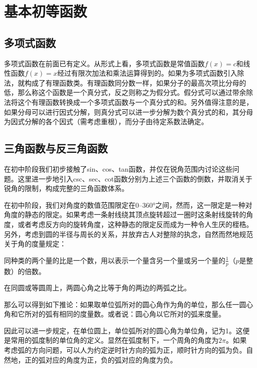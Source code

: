 \newpage
\section{基本初等函数}

\subsection{多项式函数}
多项式函数在前面已有定义。从形式上看，多项式函数是常值函数\(f(x) = c\)和线性函数\(f(x) = x\)经过有限次加法和乘法运算得到的。如果为多项式函数引入除法，就构成了{\heiti{}有理函数类}。有理函数同分数一样，如果分子的最高次项比分母的低，那么称这个函数是一个真分式，反之则称之为假分式。假分式可以通过带余除法将这个有理函数转换成一个多项式函数与一个真分式的和。另外值得注意的是，如果分母可以进行因式分解，则真分式可以进一步分解为数个真分式的和，其分母为因式分解的各个因式（需考虑重根），而分子由待定系数法确定。


\subsection{三角函数与反三角函数}
在初中阶段我们初步接触了sin、cos、tan函数，并仅在锐角范围内讨论这些问题。这里进一步地引入csc、sec、cot函数分别为上述三个函数的倒数，并取消关于锐角的限制，构成完整的三角函数体系。

在初中阶段，我们对角度的数值范围限定在0--360°之间，然而，这一限定是一种对角度的静态的限定。如果考虑一条射线绕其顶点旋转超过一圈时这条射线旋转的角度，或者考虑反方向的旋转角度，这种静态的限定反而成为一种令人生厌的桎梏。另外，考虑到圆的半径与周长的关系，并放弃古人对整除的执念，自然而然地规范关于角的度量规定：
\begin{definition}
同种类的两个量的比是一个数，用以表示一个量含另一个量或另一个量的\(\frac{1}{p}\)（\(p\)是整数）的倍数。
\end{definition}
\begin{theorem}
在同圆或等圆周上，两圆心角之比等于角的两边的两弧之比。
\end{theorem}

那么可以得到如下推论：{\kaiti{}如果取单位弧所对的圆心角作为角的单位，那么任一圆心角和它所对的弧有相同的度量数。或者说：圆心角以它所对的弧来度量。}

因此可以进一步规定，在单位圆上，单位弧所对的圆心角为单位角，记为1。这便是常用的弧度制的单位角的定义。显然在弧度制下，一个周角的角度为\(2 \pi\)。如果考虑弧的方向问题，可以人为约定逆时针方向的弧为正，顺时针方向的弧为负。自然地，正的弧对应的角度为正，负的弧对应的角度为负。

